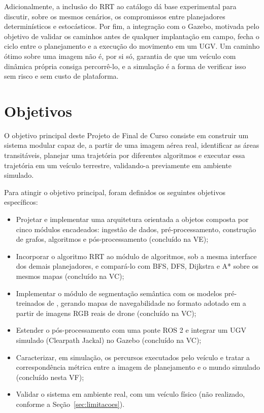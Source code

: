 \documentclass[
    12pt,
    openright,
    oneside,
    a4paper,
    english,
    brazil
]{abntex2}
\begin{document}
Adicionalmente, a inclusão do RRT ao catálogo dá base experimental para discutir, sobre os mesmos cenários, os compromissos entre planejadores determinísticos e estocásticos. Por fim, a integração com o Gazebo, motivada pelo objetivo de validar os caminhos antes de qualquer implantação em campo, fecha o ciclo entre o planejamento e a execução do movimento em um UGV. Um caminho ótimo sobre uma imagem não é, por si só, garantia de que um veículo com dinâmica própria consiga percorrê-lo, e a simulação é a forma de verificar isso sem risco e sem custo de plataforma.

\section{Objetivos}

O objetivo principal deste Projeto de Final de Curso consiste em construir um sistema modular capaz de, a partir de uma imagem aérea real, identificar as áreas transitáveis, planejar uma trajetória por diferentes algoritmos e executar essa trajetória em um veículo terrestre, validando-a previamente em ambiente simulado.

Para atingir o objetivo principal, foram definidos os seguintes objetivos específicos:

\begin{itemize}
    \item Projetar e implementar uma arquitetura orientada a objetos composta por cinco módulos encadeados: ingestão de dados, pré-processamento, construção de grafos, algoritmos e pós-processamento (concluído na VE);
    \item Incorporar o algoritmo RRT ao módulo de algoritmos, sob a mesma interface dos demais planejadores, e compará-lo com BFS, DFS, Dijkstra e A* sobre os mesmos mapas (concluído na VC);
    \item Implementar o módulo de segmentação semântica com os modelos pré-treinados de \cite{junior2024_models}, gerando mapas de navegabilidade no formato adotado em \cite{junior2025_rrt} a partir de imagens RGB reais de drone (concluído na VC);
    \item Estender o pós-processamento com uma ponte ROS 2 e integrar um UGV simulado (Clearpath Jackal) no Gazebo (concluído na VC);
    \item Caracterizar, em simulação, os percursos executados pelo veículo e tratar a correspondência métrica entre a imagem de planejamento e o mundo simulado (concluído nesta VF);
    \item Validar o sistema em ambiente real, com um veículo físico (não realizado, conforme a Seção~\ref{sec:limitacoes}).
\end{itemize}
\end{document}
